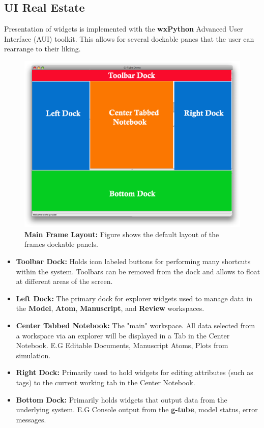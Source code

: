 \documentclass[12pt]{article}
\begin{document}
\subsection*{UI Real Estate}

Presentation of widgets is implemented with the {\bf wxPython} Advanced User Interface (AUI) toolkit. This allows for several dockable panes that the user can rearrange to their liking. 

\begin{figure}[ht]
   \centering
   \includegraphics[scale=0.6]{figures/RealEstate.eps}
   \caption{{\bf Main Frame Layout:} Figure shows the default layout of the frames dockable panels.}
   \label{fig:Real Estate}
\end{figure}

\begin{itemize}
\item[] {\bf Toolbar Dock:} Holds icon labeled buttons for performing many shortcuts within the system. Toolbars can be removed from the dock and allows to float at different areas of the screen.
\item[] {\bf Left Dock:} The primary dock for explorer widgets used to manage data in the {\bf Model}, {\bf Atom}, {\bf Manuscript}, and {\bf Review} workspaces.
\item[] {\bf Center Tabbed Notebook:} The "main" workspace. All data selected from a workspace via an explorer will be displayed in a Tab in the Center Notebook. E.G Editable Documents, Manuscript Atoms, Plots from simulation.
\item[] {\bf Right Dock:} Primarily used to hold widgets for editing attributes (such as tags) to the current working tab in the Center Notebook.
\item[] {\bf Bottom Dock:} Primarily holds widgets that output data from the underlying system. E.G Console output from the {\bf g-tube}, model status, error messages.
\end{itemize}
\end{document}
